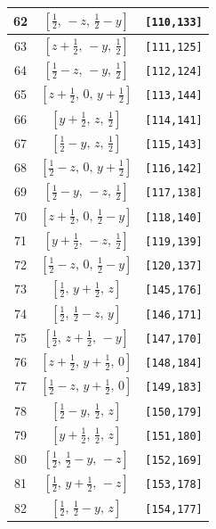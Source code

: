 \documentclass[fleqn,8pt]{jsarticle}
\begin{document}
\begin{longtable}{ccc}
62 & $\left[ \frac{1}{2},\, - z,\, \frac{1}{2} - y \right]$ & {\tt [110,133]} \\ \hline
63 & $\left[ z + \frac{1}{2},\, - y,\, \frac{1}{2} \right]$ & {\tt [111,125]} \\ \hline
64 & $\left[ \frac{1}{2} - z,\, - y,\, \frac{1}{2} \right]$ & {\tt [112,124]} \\ \hline
65 & $\left[ z + \frac{1}{2},\, 0,\, y + \frac{1}{2} \right]$ & {\tt [113,144]} \\ \hline
66 & $\left[ y + \frac{1}{2},\, z,\, \frac{1}{2} \right]$ & {\tt [114,141]} \\ \hline
67 & $\left[ \frac{1}{2} - y,\, z,\, \frac{1}{2} \right]$ & {\tt [115,143]} \\ \hline
68 & $\left[ \frac{1}{2} - z,\, 0,\, y + \frac{1}{2} \right]$ & {\tt [116,142]} \\ \hline
69 & $\left[ \frac{1}{2} - y,\, - z,\, \frac{1}{2} \right]$ & {\tt [117,138]} \\ \hline
70 & $\left[ z + \frac{1}{2},\, 0,\, \frac{1}{2} - y \right]$ & {\tt [118,140]} \\ \hline
71 & $\left[ y + \frac{1}{2},\, - z,\, \frac{1}{2} \right]$ & {\tt [119,139]} \\ \hline
72 & $\left[ \frac{1}{2} - z,\, 0,\, \frac{1}{2} - y \right]$ & {\tt [120,137]} \\ \hline
73 & $\left[ \frac{1}{2},\, y + \frac{1}{2},\, z \right]$ & {\tt [145,176]} \\ \hline
74 & $\left[ \frac{1}{2},\, \frac{1}{2} - z,\, y \right]$ & {\tt [146,171]} \\ \hline
75 & $\left[ \frac{1}{2},\, z + \frac{1}{2},\, - y \right]$ & {\tt [147,170]} \\ \hline
76 & $\left[ z + \frac{1}{2},\, y + \frac{1}{2},\, 0 \right]$ & {\tt [148,184]} \\ \hline
77 & $\left[ \frac{1}{2} - z,\, y + \frac{1}{2},\, 0 \right]$ & {\tt [149,183]} \\ \hline
78 & $\left[ \frac{1}{2} - y,\, \frac{1}{2},\, z \right]$ & {\tt [150,179]} \\ \hline
79 & $\left[ y + \frac{1}{2},\, \frac{1}{2},\, z \right]$ & {\tt [151,180]} \\ \hline
80 & $\left[ \frac{1}{2},\, \frac{1}{2} - y,\, - z \right]$ & {\tt [152,169]} \\ \hline
81 & $\left[ \frac{1}{2},\, y + \frac{1}{2},\, - z \right]$ & {\tt [153,178]} \\ \hline
82 & $\left[ \frac{1}{2},\, \frac{1}{2} - y,\, z \right]$ & {\tt [154,177]} \\ \hline

\end{longtable}
\end{document}
